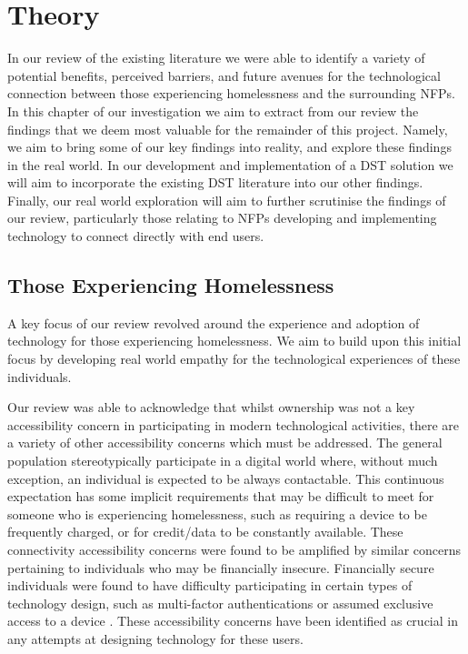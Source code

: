 \chapter{Theory}

In our review of the existing literature we were able to identify a variety of potential benefits, perceived barriers, and future avenues for the technological connection between those experiencing homelessness and the surrounding NFPs. In this chapter of our investigation we aim to extract from our review the findings that we deem most valuable for the remainder of this project. Namely, we aim to bring some of our key findings into reality, and explore these findings in the real world. In our development and implementation of a DST solution we will aim to incorporate the existing DST literature into our other findings. Finally, our real world exploration will aim to further scrutinise the findings of our review, particularly those relating to NFPs developing and implementing technology to connect directly with end users.

\section{Those Experiencing Homelessness}

A key focus of our review revolved around the experience and adoption of technology for those experiencing homelessness. We aim to build upon this initial focus by developing real world empathy for the technological experiences of these individuals.

Our review was able to acknowledge that whilst ownership was not a key accessibility concern in participating in modern technological activities, there are a variety of other accessibility concerns which must be addressed. The general population stereotypically participate in a digital world where, without much exception, an individual is expected to be always contactable. This continuous expectation has some implicit requirements that may be difficult to meet for someone who is experiencing homelessness, such as requiring a device to be frequently charged, or for credit/data to be constantly available. These connectivity accessibility concerns were found to be amplified by similar concerns pertaining to individuals who may be financially insecure. Financially secure individuals were found to have difficulty participating in certain types of technology design, such as multi-factor authentications or assumed exclusive access to a device \cite{sleeper2019tough}. These accessibility concerns have been identified as crucial in any attempts at designing technology for these users.

